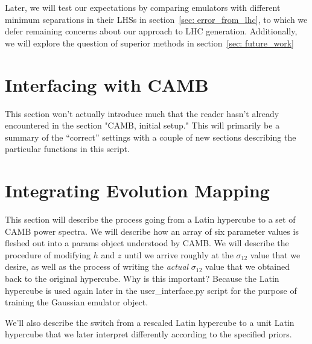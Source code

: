 
Later, we will test our expectations by comparing emulators with different
minimum separations in their LHSs in section~\ref{sec: error_from_lhc}, to
which we defer remaining concerns about our approach to LHC generation.
Additionally, we will explore the question of superior methods in
section~\ref{sec: future_work}


\section{Interfacing with CAMB}


This section won't actually introduce much that the reader hasn't already encountered in the section "CAMB, initial setup." This will primarily be a summary of the ``correct'' settings with a couple of new sections describing the particular functions in this script.

\section{Integrating Evolution Mapping}
\label{sec: generate_emu_data}


This section will describe the process going from a Latin hypercube to a set of CAMB power spectra. We will describe how an array of six parameter values is fleshed out into a params object understood by CAMB. We will describe the procedure of modifying $h$ and $z$ until we arrive roughly at the $\sigma_{12}$ value that we desire, as well as the process of writing the \textit{actual} $\sigma_{12}$ value that we obtained back to the original hypercube. Why is this important? Because the Latin hypercube is used again later in the user\_interface.py script for the purpose of training the Gaussian emulator object.

We'll also describe the switch from a rescaled Latin hypercube to a unit Latin hypercube that we later interpret differently according to the specified priors.

